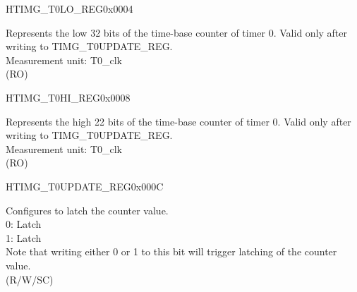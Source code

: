\begin{register}{H}{TIMG\_T0LO\_REG}{0x0004}\label{regdesc:TIMGTXLOREG}
%
\regnewline%
\begin{regdesc}\begin{reglist}
\label{fielddesc:TIMGTXLO}\item [TIMG\_T0\_LO] Represents the low 32 bits of the time-base counter of timer 0. Valid only after writing to TIMG\_T0UPDATE\_REG. \\
Measurement unit: T0\_clk \\ (RO)
\end{reglist}\end{regdesc}
\end{register}


\begin{register}{H}{TIMG\_T0HI\_REG}{0x0008}\label{regdesc:TIMGTXHIREG}
%
%
\regnewline%
\begin{regdesc}\begin{reglist}
\label{fielddesc:TIMGTXHI}\item [TIMG\_T0\_HI] Represents the high 22 bits of the time-base counter of timer 0. Valid only after writing to TIMG\_T0UPDATE\_REG. \\
Measurement unit: T0\_clk \\ (RO)
\end{reglist}\end{regdesc}
\end{register}


\begin{register}{H}{TIMG\_T0UPDATE\_REG}{0x000C}\label{regdesc:TIMGTXUPDATEREG}
%
%
\regnewline%
\begin{regdesc}\begin{reglist}
\label{fielddesc:TIMGTXUPDATE}\item [TIMG\_T0\_UPDATE] Configures to latch the counter value. \\
0: Latch \\
1: Latch \\ 
Note that writing either 0 or 1 to this bit will trigger latching of the counter value. \\ (R/W/SC)
\end{reglist}\end{regdesc}
\end{register}


